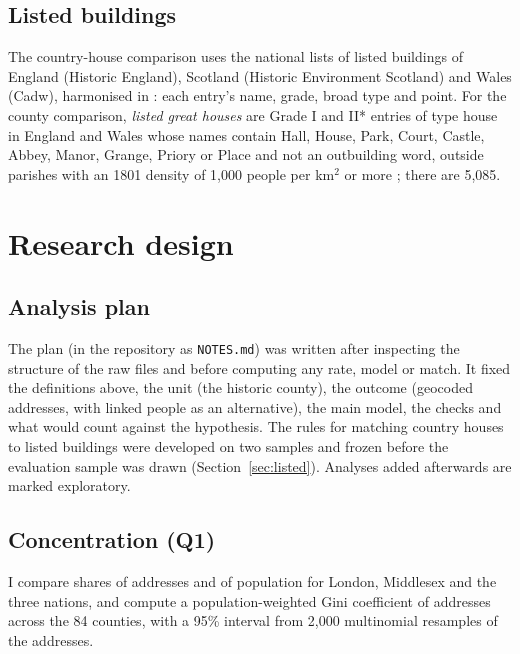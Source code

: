 \documentclass[11pt,a4paper]{article}
\begin{document}
\subsection{Listed buildings}
The country-house comparison uses the national lists of listed buildings of England (Historic England), Scotland (Historic Environment Scotland) and Wales (Cadw), harmonised in \citet{hotham2026listed}: each entry's name, grade, broad type and point. For the county comparison, \textit{listed great houses} are Grade I and II* entries of type house in England and Wales whose names contain Hall, House, Park, Court, Castle, Abbey, Manor, Grange, Priory or Place and not an outbuilding word, outside parishes with an 1801 density of 1,000 people per km$^2$ or more \citep{caprettini2020}; there are 5,085.

\section{Research design}\label{sec:design}
\subsection{Analysis plan}
The plan (in the repository as \texttt{NOTES.md}) was written after inspecting the structure of the raw files and before computing any rate, model or match. It fixed the definitions above, the unit (the historic county), the outcome (geocoded addresses, with linked people as an alternative), the main model, the checks and what would count against the hypothesis. The rules for matching country houses to listed buildings were developed on two samples and frozen before the evaluation sample was drawn (Section~\ref{sec:listed}). Analyses added afterwards are marked exploratory.

\subsection{Concentration (Q1)}
I compare shares of addresses and of population for London, Middlesex and the three nations, and compute a population-weighted Gini coefficient of addresses across the 84 counties, with a 95\% interval from 2,000 multinomial resamples of the addresses.
\end{document}
